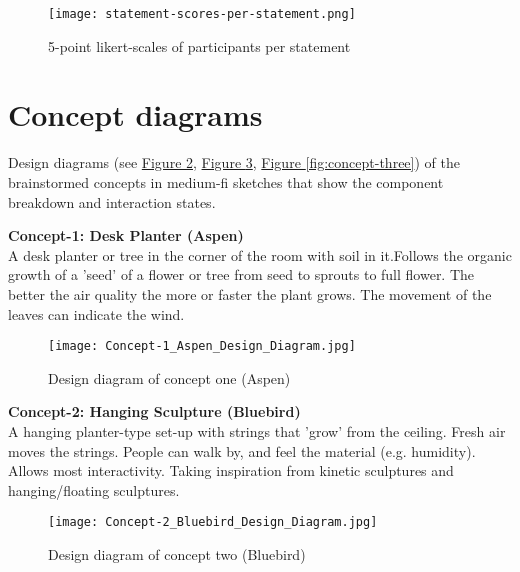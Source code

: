 \begin{appendices}
\begin{figure}[H]
    \centering
    \texttt{[image: statement-scores-per-statement.png]}
    \caption{5-point likert-scales of participants per statement}
    \label{fig:survey-statement-scores}
\end{figure}

\newpage

\section{Concept diagrams}
\label{appendix:conceptdiagrams}

Design diagrams (see \hyperref[fig:concept-one]{Figure \ref{fig:concept-one}}, \hyperref[fig:concept-two]{Figure \ref{fig:concept-two}}, \hyperref[fig:concept-three]{Figure \ref{fig:concept-three}}) of the brainstormed concepts in medium-fi sketches that show the component breakdown and interaction states.\\

\vspace{1em}

\textbf{Concept-1: Desk Planter (Aspen)}\\
A desk planter or tree in the corner of the room with soil in it.Follows the organic growth of a 'seed' of a flower or tree from seed to sprouts to full flower. The better the air quality the more or faster the plant grows. The movement of the leaves can indicate the wind.


\begin{figure}[H]
    \centering
    \texttt{[image: Concept-1\_Aspen\_Design\_Diagram.jpg]}
    \caption{Design diagram of concept one (Aspen)}
    \label{fig:concept-one}
\end{figure}

\textbf{Concept-2: Hanging Sculpture (Bluebird)}\\
A hanging planter-type set-up with strings that 'grow' from the ceiling. Fresh air moves the strings. People can walk by, and feel the material (e.g. humidity). Allows most interactivity. Taking inspiration from kinetic sculptures and hanging/floating sculptures.

\begin{figure}[H]
    \centering
    \texttt{[image: Concept-2\_Bluebird\_Design\_Diagram.jpg]}
    \caption{Design diagram of concept two (Bluebird)}
    \label{fig:concept-two}
\end{figure}


\end{appendices}
